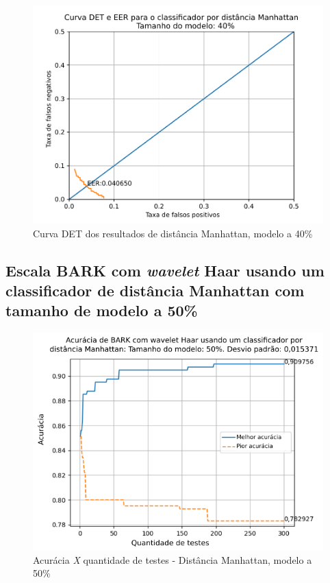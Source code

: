 			\begin{figure}[!h]
				\centering
				\includegraphics[width=.6\linewidth]{images/results/det/DET_for_classifier_Manhattan_40}
				\caption{Curva DET dos resultados de distância Manhattan, modelo a 40\%}
				\label{fig:detforclassifiermanhattan40}
			\end{figure}
		
			\FloatBarrier
		\subsection{Escala BARK com \textit{wavelet} Haar usando um classificador de distância Manhattan com tamanho de modelo a 50\%}
		
			
			
			\begin{figure}[ht]
				\centering
				\includegraphics[width=.6\linewidth]{images/results/confusionMatrices/classifier_Manhattan_50.png}
				\caption{Acurácia \textit{X} quantidade de testes - Distância Manhattan, modelo a 50\%}
				\label{fig:classifiermanhattan50}
			\end{figure}
	
